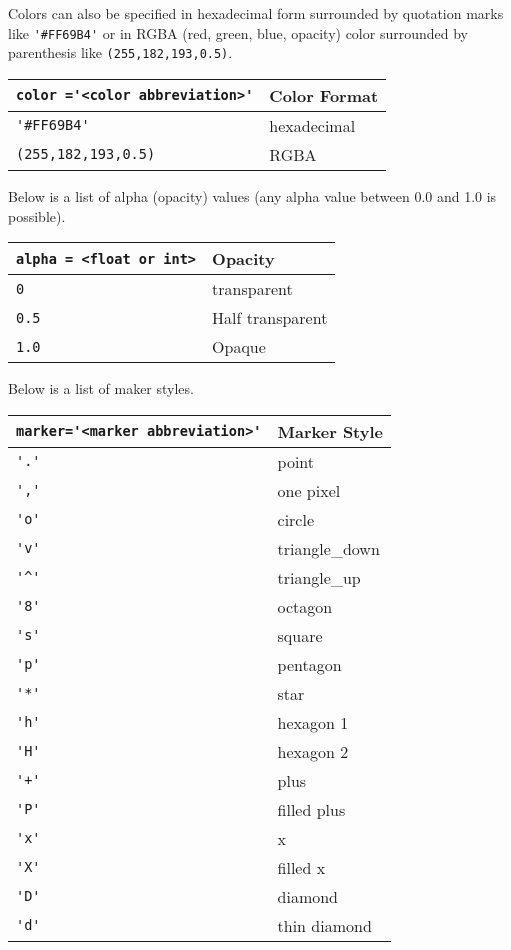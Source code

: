 \documentclass{book}
\newcommand{\passthrough}[1]{#1}
\begin{document}
Colors can also be specified in hexadecimal form surrounded by quotation
marks like \passthrough{\lstinline!'#FF69B4'!} or in RGBA (red, green,
blue, opacity) color surrounded by parenthesis like
\passthrough{\lstinline!(255,182,193,0.5)!}.

\begin{longtable}[]{@{}ll@{}}
\toprule
\passthrough{\lstinline!color ='<color abbreviation>'!} & Color
Format\tabularnewline
\midrule
\endhead
\passthrough{\lstinline!'#FF69B4'!} & hexadecimal\tabularnewline
\passthrough{\lstinline!(255,182,193,0.5)!} & RGBA\tabularnewline
\bottomrule
\end{longtable}

Below is a list of alpha (opacity) values (any alpha value between 0.0
and 1.0 is possible).

\begin{longtable}[]{@{}ll@{}}
\toprule
\passthrough{\lstinline!alpha = <float or int>!} &
Opacity\tabularnewline
\midrule
\endhead
\passthrough{\lstinline!0!} & transparent\tabularnewline
\passthrough{\lstinline!0.5!} & Half transparent\tabularnewline
\passthrough{\lstinline!1.0!} & Opaque\tabularnewline
\bottomrule
\end{longtable}

Below is a list of maker styles.

\begin{longtable}[]{@{}ll@{}}
\toprule
\passthrough{\lstinline!marker='<marker abbreviation>'!} & Marker
Style\tabularnewline
\midrule
\endhead
\passthrough{\lstinline!'.'!} & point\tabularnewline
\passthrough{\lstinline!','!} & one pixel\tabularnewline
\passthrough{\lstinline!'o'!} & circle\tabularnewline
\passthrough{\lstinline!'v'!} & triangle\_down\tabularnewline
\passthrough{\lstinline!'^'!} & triangle\_up\tabularnewline
\passthrough{\lstinline!'8'!} & octagon\tabularnewline
\passthrough{\lstinline!'s'!} & square\tabularnewline
\passthrough{\lstinline!'p'!} & pentagon\tabularnewline
\passthrough{\lstinline!'*'!} & star\tabularnewline
\passthrough{\lstinline!'h'!} & hexagon 1\tabularnewline
\passthrough{\lstinline!'H'!} & hexagon 2\tabularnewline
\passthrough{\lstinline!'+'!} & plus\tabularnewline
\passthrough{\lstinline!'P'!} & filled plus\tabularnewline
\passthrough{\lstinline!'x'!} & x\tabularnewline
\passthrough{\lstinline!'X'!} & filled x\tabularnewline
\passthrough{\lstinline!'D'!} & diamond\tabularnewline
\passthrough{\lstinline!'d'!} & thin diamond\tabularnewline
\bottomrule
\end{longtable}
\end{document}
